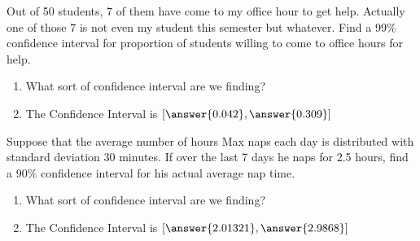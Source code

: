 \documentclass{ximera}
\begin{document}
\begin{problem}
Out of 50 students, 7 of them have come to my office hour to get help.  Actually one of those 7 is not even my student this semester but whatever.  Find a 99\% confidence interval for proportion of students willing to come to office hours for help.

  
  \begin{enumerate}
\item What sort of confidence interval are we finding?

\begin{multipleChoice}
\end{multipleChoice}

\item The Confidence Interval is $[\answer{0.042}, \answer{0.309}]$

\end{enumerate}

  

\end{problem}


\begin{problem}
Suppose that the average number of hours Max naps each day is distributed with standard deviation 30 minutes.  If over the last 7 days he naps for 2.5 hours, find a 90\% confidence interval for his actual average nap time.


  \begin{enumerate}
\item What sort of confidence interval are we finding?

\begin{multipleChoice}
\end{multipleChoice}

\item The Confidence Interval is $[\answer{2.01321}, \answer{2.9868}]$

\end{enumerate}



\end{problem}
\end{document}
